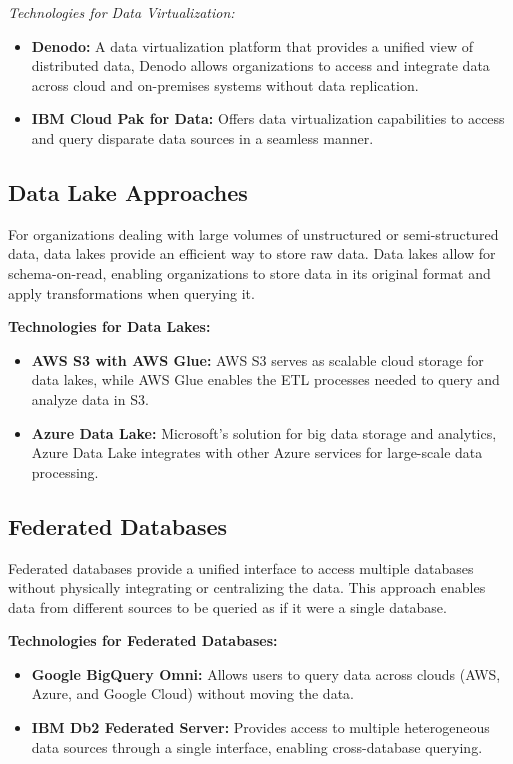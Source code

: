 \documentclass[12pt]{article}
\begin{document}
\textit{Technologies for Data Virtualization:}
\begin{itemize}
    \item \textbf{Denodo:} A data virtualization platform that provides a unified view of distributed data, Denodo allows organizations to access and integrate data across cloud and on-premises systems without data replication.
    \item \textbf{IBM Cloud Pak for Data:} Offers data virtualization capabilities to access and query disparate data sources in a seamless manner.
\end{itemize}

\subsection{Data Lake Approaches}
For organizations dealing with large volumes of unstructured or semi-structured data, data lakes provide an efficient way to store raw data. Data lakes allow for schema-on-read, enabling organizations to store data in its original format and apply transformations when querying it.

\textbf{Technologies for Data Lakes:}
\begin{itemize}
    \item \textbf{AWS S3 with AWS Glue:} AWS S3 serves as scalable cloud storage for data lakes, while AWS Glue enables the ETL processes needed to query and analyze data in S3.
    \item \textbf{Azure Data Lake:} Microsoft's solution for big data storage and analytics, Azure Data Lake integrates with other Azure services for large-scale data processing.
\end{itemize}

\subsection{Federated Databases}
Federated databases provide a unified interface to access multiple databases without physically integrating or centralizing the data. This approach enables data from different sources to be queried as if it were a single database.

\textbf{Technologies for Federated Databases:}
\begin{itemize}
    \item \textbf{Google BigQuery Omni:} Allows users to query data across clouds (AWS, Azure, and Google Cloud) without moving the data.
    \item \textbf{IBM Db2 Federated Server:} Provides access to multiple heterogeneous data sources through a single interface, enabling cross-database querying.
\end{itemize}
\end{document}
